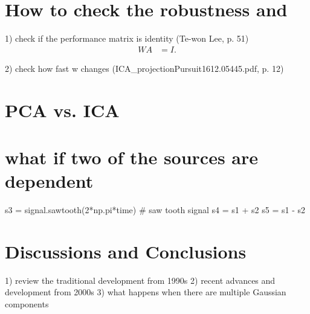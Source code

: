 \documentclass[aps,prl,preprint,superscriptaddress]{revtex4-2}
\begin{document}
\section{How to check the robustness and }

1) check if the performance matrix is identity (Te-won Lee, p. 51)
\begin{align}
W A &= I.
\end{align}

2) check how fast w changes (ICA_projectionPursuit1612.05445.pdf, p. 12)


\section{PCA vs. ICA}

\section{what if two of the sources are dependent}
s3 = signal.sawtooth(2*np.pi*time) # saw tooth signal
s4 = s1 + s2
s5 = s1 - s2

\section{Discussions and Conclusions}
1) review the traditional development from 1990s
2) recent advances and development from 2000s  
3) what happens when there are multiple Gaussian components

\begin{acknowledgments}

\end{acknowledgments}



%
\end{document}
